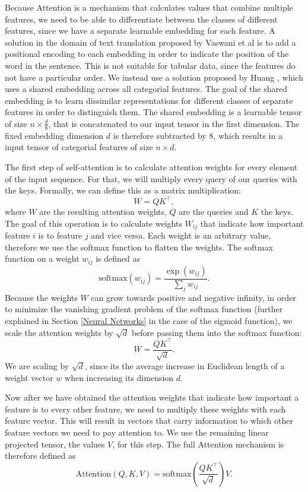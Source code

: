 Because Attention is a mechanism that calculates values that combine multiple features, we need to be able to differentiate between the classes of different features, since we have a separate learnable embedding for each feature. A solution in the domain of text translation proposed by Vaswani et al \cite{attention_is_all_you_need} is to add a positional encoding to each embedding in order to indicate the position of the word in the sentence. This is not suitable for tabular data, since the features do not have a particular order. We instead use a solution proposed by Huang \cite{tab_transformer}, which uses a shared embedding across all categorial features. The goal of the shared embedding is to learn dissimilar representations for different classes of separate features in order to distinguish them. The shared embedding is a learnable tensor of size $n \times \frac{d}{8}$, that is concatenated to our input tensor in the first dimension. The fixed embedding dimension $d$ is therefore subtracted by 8, which results in a input tensor of categorial features of size $n \times d$. 

The first step of self-attention is to calculate attention weights for every element of the input sequence. For that, we will multiply every query of our queries with the keys. Formally, we can define this as a matrix multiplication:
$$W = QK^\intercal,$$
where $W$ are the resulting attention weights, $Q$ are the queries and $K$ the keys. The goal of this operation is to calculate weights $W_{ij}$ that indicate how important feature $i$ is to feature $j$ and vice versa. Each weight is an arbitrary value, therefore we use the softmax function \cite{neural_networks_pattern_recognition} to flatten the weights. The softmax function on a weight $w_{ij}$ is defined as
$$\text{softmax}(w_{ij}) = \frac{\exp(w_{ij})}{\sum_j{w_{ij}}}.$$
Because the weights $W$ can grow towards positive and negative infinity, in order to minimize the vanishing gradient problem of the softmax function (further explained in Section \ref{Neural Networks} in the case of the sigmoid function), we scale the attention weights by $\sqrt{d}$ before passing them into the softmax function:
$$W = \frac{QK^\intercal}{\sqrt{d}}.$$
We are scaling by $\sqrt{d}$, since its the average increase in Euclidean length of a weight vector $w$ when increasing its dimension $d$. \cite{attention_is_all_you_need}

Now after we have obtained the attention weights that indicate how important a feature is to every other feature, we need to multiply these weights with each feature vector. This will result in vectors that carry information to which other feature vectors we need to pay attention to. We use the remaining linear projected tensor, the values $V$, for this step. The full Attention mechanism is therefore defined as
$$\text{Attention}(Q, K, V) = \text{softmax}(\frac{QK^\intercal}{\sqrt{d}})V.$$

